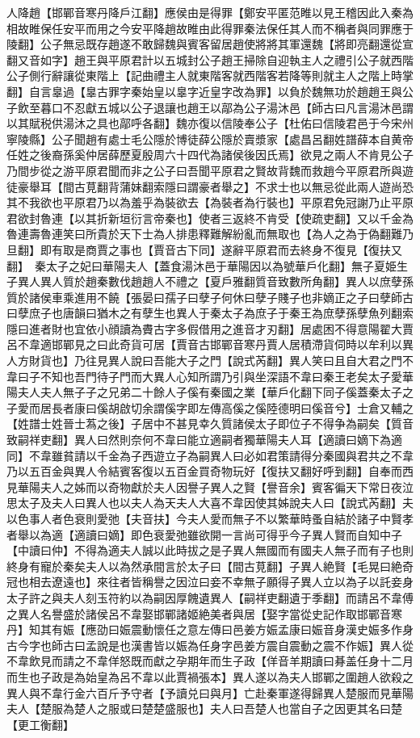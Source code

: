 人降趙【邯鄲音寒丹降戶江翻】應侯由是得罪【鄭安平匿范睢以見王稽因此入秦為相故睢保任安平而用之今安平降趙故睢由此得罪秦法保任其人而不稱者與同罪應于陵翻】公子無忌既存趙遂不敢歸魏與賓客留居趙使將將其軍還魏【將即亮翻還從宣翻又音如字】趙王與平原君計以五城封公子趙王掃除自迎執主人之禮引公子就西階公子側行辭讓從東階上【記曲禮主人就東階客就西階客若降等則就主人之階上時掌翻】自言辠過【辠古罪字秦始皇以辠字近皇字改為罪】以負於魏無功於趙趙王與公子飲至暮口不忍獻五城以公子退讓也趙王以鄗為公子湯沐邑【師古曰凡言湯沐邑謂以其賦税供湯沐之具也鄗呼各翻】魏亦復以信陵奉公子【杜佑曰信陵君邑于今宋州寧陵縣】公子聞趙有處士毛公隱於博徒薛公隱於賣漿家【處昌呂翻姓譜薛本自黄帝任姓之後裔孫奚仲居薛歷夏殷周六十四代為諸侯後因氏焉】欲見之兩人不肯見公子乃間步從之游平原君聞而非之公子曰吾聞平原君之賢故背魏而救趙今平原君所與遊徒豪舉耳【間古莧翻背蒲妹翻索隱曰謂豪者舉之】不求士也以無忌從此兩人遊尚恐其不我欲也平原君乃以為羞乎為裝欲去【為裝者為行裝也】平原君免冠謝乃止平原君欲封魯連【以其折新垣衍言帝秦也】使者三返終不肯受【使疏吏翻】又以千金為魯連壽魯連笑曰所貴於天下士為人排患釋難解紛亂而無取也【為人之為于偽翻難乃旦翻】即有取是商賈之事也【賈音古下同】遂辭平原君而去終身不復見【復扶又翻】　秦太子之妃曰華陽夫人【蓋食湯沐邑于華陽因以為號華戶化翻】無子夏姫生子異人異人質於趙秦數伐趙趙人不禮之【夏戶雅翻質音致數所角翻】異人以庶孽孫質於諸侯車乘進用不饒【張晏曰孺子曰孽子何休曰孽子賤子也非嫡正之子曰孽師古曰孽庶子也唐韻曰猶木之有孽生也異人于秦太子為庶子于秦王為庶孽孫孽魚列翻索隱曰進者財也宜依小顔讀為賮古字多假借用之進音才刃翻】居處困不得意陽翟大賈呂不韋適邯鄲見之曰此奇貨可居【賈音古邯鄲音寒丹賈人居積滯貨伺時以牟利以異人方財貨也】乃往見異人說曰吾能大子之門【說式芮翻】異人笑曰且自大君之門不韋曰子不知也吾門待子門而大異人心知所謂乃引與坐深語不韋曰秦王老矣太子愛華陽夫人夫人無子子之兄弟二十餘人子傒有秦國之業【華戶化翻下同子傒蓋秦太子之子愛而居長者康曰傒胡啟切余謂傒字即左傳高傒之傒陸德明曰傒音兮】士倉又輔之【姓譜士姓晉士蒍之後】子居中不甚見幸久質諸侯太子即位子不得争為嗣矣【質音致嗣祥吏翻】異人曰然則奈何不韋曰能立適嗣者獨華陽夫人耳【適讀曰嫡下為適同】不韋雖貧請以千金為子西遊立子為嗣異人曰必如君策請得分秦國與君共之不韋乃以五百金與異人令結賓客復以五百金買奇物玩好【復扶又翻好呼到翻】自奉而西見華陽夫人之姊而以奇物獻於夫人因譽子異人之賢【譽音余】賓客徧天下常日夜泣思太子及夫人曰異人也以夫人為天夫人大喜不韋因使其姊說夫人曰【說式芮翻】夫以色事人者色衰則愛弛【夫音扶】今夫人愛而無子不以繁華時蚤自結於諸子中賢孝者舉以為適【適讀曰嫡】即色衰愛弛雖欲開一言尚可得乎今子異人賢而自知中子【中讀曰仲】不得為適夫人誠以此時拔之是子異人無國而有國夫人無子而有子也則終身有寵於秦矣夫人以為然承間言於太子曰【間古莧翻】子異人絶賢【毛晃曰絶奇冠也相去遼遠也】來往者皆稱譽之因泣曰妾不幸無子願得子異人立以為子以託妾身太子許之與夫人刻玉符約以為嗣因厚餽遺異人【嗣祥吏翻遺于季翻】而請呂不韋傅之異人名譽盛於諸侯呂不韋娶邯鄲諸姬絶美者與居【娶字當從史記作取邯鄲音寒丹】知其有娠【應劭曰娠震動懷任之意左傳曰邑姜方娠孟康曰娠音身漢史娠多作身古今字也師古曰孟說是也漢書皆以娠為任身字邑姜方震自震動之震不作娠】異人從不韋飲見而請之不韋佯怒既而獻之孕期年而生子政【佯音羊期讀曰朞盖任身十二月而生也子政是為始皇為呂不韋以此賈禍張本】異人遂以為夫人邯鄲之圍趙人欲殺之異人與不韋行金六百斤予守者【予讀兑曰與月】亡赴秦軍遂得歸異人楚服而見華陽夫人【楚服為楚人之服或曰楚楚盛服也】夫人曰吾楚人也當自子之因更其名曰楚【更工衡翻】

